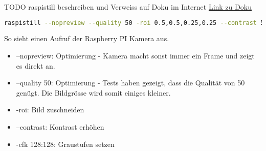 \label{ss-schnittstelle-raspistill}
TODO raspistill beschreiben und Verweiss auf Doku im Internet \href{http://www.raspberrypi.org/wp-content/uploads/2013/07/RaspiCam-Documentation.pdf}{Link zu Doku}


\begin{lstlisting}[language=bash]
raspistill --nopreview --quality 50 -roi 0.5,0.5,0.25,0.25 --contrast 50 -cfx 128:128 
\end{lstlisting}
So sieht einen Aufruf der Raspberry PI Kamera aus. 
\begin{itemize}
	\item --nopreview: Optimierung - Kamera macht sonst immer ein Frame und zeigt es direkt an.
	\item --quality 50: Optimierung - Tests haben gezeigt, dass die Qualität von 50 genügt. Die Bildgrösse wird somit einiges kleiner.
	\item -roi: Bild zuschneiden
	\item --contrast: Kontrast erhöhen
	\item -cfk 128:128: Graustufen setzen
\end{itemize} 
